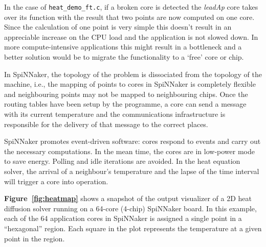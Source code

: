\documentclass[oneside, a4paper, 11pt]{memoir}
\begin{document}
In the case of \verb|heat_demo_ft.c|, if a broken core is detected the \emph{leadAp} core takes over its function with the result that two points are now computed on one core. Since the calculation of one point is very simple this doesn't result in an appreciable increase on the CPU load and the application is not slowed down. In more compute-intensive applications this might result in a bottleneck and a better solution would be to migrate the functionality to a `free' core or chip.

In SpiNNaker, the topology of the problem is dissociated from the topology of the machine, i.e., the mapping of points to cores in SpiNNaker is completely flexible and neighbouring points may not be mapped to neighbouring chips. Once the routing tables have been setup by the programme, a core can send a message with its current temperature and the communications infrastructure is responsible for the delivery of that message to the correct places.

SpiNNaker promotes event-driven software: cores respond to events and carry out the necessary computations. In the mean time, the cores are in low-power mode to save energy. Polling and idle iterations are avoided. In the heat equation solver, the arrival of a neighbour's temperature and the lapse of the time interval will trigger a core into operation.

\textbf{Figure~\ref{fig:heatmap}} shows a snapshot of the output visualizer of a 2D heat diffusion solver running on a 64-core (4-chip) SpiNNaker board. In this example, each of the 64 application cores in SpiNNaker is assigned a single point in a ``hexagonal'' region. Each square in the plot represents the temperature at a given point in the region.

%
%
%
%
\end{document}
